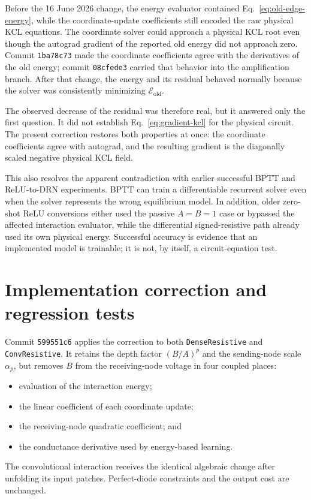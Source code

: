 \documentclass[11pt]{article}
\newcommand{\Eold}{\mathcal{E}_{\mathrm{old}}}
\begin{document}
Before the 16 June 2026 change, the energy evaluator contained
Eq.~\eqref{eq:old-edge-energy}, while the coordinate-update coefficients still
encoded the raw physical KCL equations.  The coordinate solver could approach a
physical KCL root even though the autograd gradient of the reported old energy
did not approach zero.  Commit \texttt{1ba78c73} made the coordinate
coefficients agree with the derivatives of the old energy; commit
\texttt{08cfede3} carried that behavior into the amplification branch.  After
that change, the energy and its residual behaved normally because the solver
was consistently minimizing $\Eold$.

The observed decrease of the residual was therefore real, but it answered only
the first question.  It did not establish Eq.~\eqref{eq:gradient-kcl} for the
physical circuit.  The present correction restores both properties at once:
the coordinate coefficients agree with autograd, and the resulting gradient is
the diagonally scaled negative physical KCL field.

This also resolves the apparent contradiction with earlier successful BPTT and
ReLU-to-DRN experiments.  BPTT can train a differentiable recurrent solver even
when the solver represents the wrong equilibrium model.  In addition, older
zero-shot ReLU conversions either used the passive $A=B=1$ case or bypassed the
affected interaction evaluator, while the differential signed-resistive path
already used its own physical energy.  Successful accuracy is evidence that an
implemented model is trainable; it is not, by itself, a circuit-equation test.

\section{Implementation correction and regression tests}

Commit \texttt{599551c6} applies the correction to both
\texttt{DenseResistive} and \texttt{ConvResistive}.  It retains the depth factor
$(B/A)^p$ and the sending-node scale $\alpha_p$, but removes $B$ from the
receiving-node voltage in four coupled places:
\begin{itemize}
  \item evaluation of the interaction energy;
  \item the linear coefficient of each coordinate update;
  \item the receiving-node quadratic coefficient; and
  \item the conductance derivative used by energy-based learning.
\end{itemize}
The convolutional interaction receives the identical algebraic change after
unfolding its input patches.  Perfect-diode constraints and the output cost are
unchanged.
\end{document}
